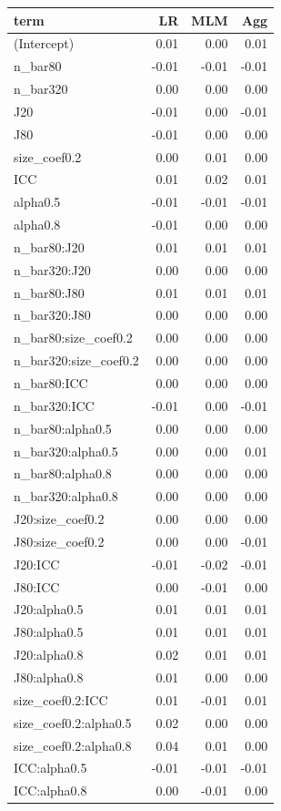 \documentclass[
]{book}
\begin{document}
\begin{tabular}{l|r|r|r}
\hline
term & LR & MLM & Agg\\
\hline
(Intercept) & 0.01 & 0.00 & 0.01\\
\hline
n\_bar80 & -0.01 & -0.01 & -0.01\\
\hline
n\_bar320 & 0.00 & 0.00 & 0.00\\
\hline
J20 & -0.01 & 0.00 & -0.01\\
\hline
J80 & -0.01 & 0.00 & 0.00\\
\hline
size\_coef0.2 & 0.00 & 0.01 & 0.00\\
\hline
ICC & 0.01 & 0.02 & 0.01\\
\hline
alpha0.5 & -0.01 & -0.01 & -0.01\\
\hline
alpha0.8 & -0.01 & 0.00 & 0.00\\
\hline
n\_bar80:J20 & 0.01 & 0.01 & 0.01\\
\hline
n\_bar320:J20 & 0.00 & 0.00 & 0.00\\
\hline
n\_bar80:J80 & 0.01 & 0.01 & 0.01\\
\hline
n\_bar320:J80 & 0.00 & 0.00 & 0.00\\
\hline
n\_bar80:size\_coef0.2 & 0.00 & 0.00 & 0.00\\
\hline
n\_bar320:size\_coef0.2 & 0.00 & 0.00 & 0.00\\
\hline
n\_bar80:ICC & 0.00 & 0.00 & 0.00\\
\hline
n\_bar320:ICC & -0.01 & 0.00 & -0.01\\
\hline
n\_bar80:alpha0.5 & 0.00 & 0.00 & 0.00\\
\hline
n\_bar320:alpha0.5 & 0.00 & 0.00 & 0.01\\
\hline
n\_bar80:alpha0.8 & 0.00 & 0.00 & 0.00\\
\hline
n\_bar320:alpha0.8 & 0.00 & 0.00 & 0.00\\
\hline
J20:size\_coef0.2 & 0.00 & 0.00 & 0.00\\
\hline
J80:size\_coef0.2 & 0.00 & 0.00 & -0.01\\
\hline
J20:ICC & -0.01 & -0.02 & -0.01\\
\hline
J80:ICC & 0.00 & -0.01 & 0.00\\
\hline
J20:alpha0.5 & 0.01 & 0.01 & 0.01\\
\hline
J80:alpha0.5 & 0.01 & 0.01 & 0.01\\
\hline
J20:alpha0.8 & 0.02 & 0.01 & 0.01\\
\hline
J80:alpha0.8 & 0.01 & 0.00 & 0.00\\
\hline
size\_coef0.2:ICC & 0.01 & -0.01 & 0.01\\
\hline
size\_coef0.2:alpha0.5 & 0.02 & 0.00 & 0.00\\
\hline
size\_coef0.2:alpha0.8 & 0.04 & 0.01 & 0.00\\
\hline
ICC:alpha0.5 & -0.01 & -0.01 & -0.01\\
\hline
ICC:alpha0.8 & 0.00 & -0.01 & 0.00\\
\hline
\end{tabular}
\end{document}
